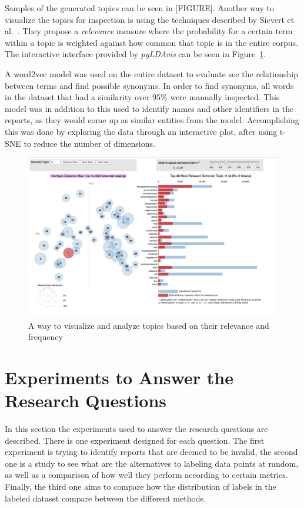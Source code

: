 Samples of the generated topics can be seen in [FIGURE].
Another way to visualize the topics for inspection is using the techniques described by Sievert et al\@.~\cite{sievert2014ldavis}.
They propose a \textit{relevance} measure where the probability for a certain term within a topic is weighted against how common that topic is in the entire corpus.
The interactive interface provided by \textit{pyLDAvis} can be seen in Figure~\ref{fig:ldavis-sample}.

A word2vec model was used on the entire dataset to evaluate see the relationship between terms and find possible synonyms.
In order to find synonyms, all words in the dataset that had a similarity over 95\% were manually inspected.
This model was in addition to this used to identify names and other identifiers in the reports, as they would come up as similar entities from the model.
Accomplishing this was done by exploring the data through an interactive plot, after using t-SNE to reduce the number of dimensions.

\begin{figure}
    \centering
    \includegraphics[scale=0.3]{figures/ldavis-sample.png}
    \caption{A way to visualize and analyze topics based on their relevance and frequency}
    \label{fig:ldavis-sample}
\end{figure}

\section{Experiments to Answer the Research Questions}
In this section the experiments used to answer the research questions are described.
There is one experiment designed for each question.
The first experiment is trying to identify reports that are deemed to be invalid, the second one is a study to see what are the alternatives to labeling data points at random, as well as a comparison of how well they perform according to certain metrics.
Finally, the third one aims to compare how the distribution of labels in the labeled dataset compare between the different methods.

